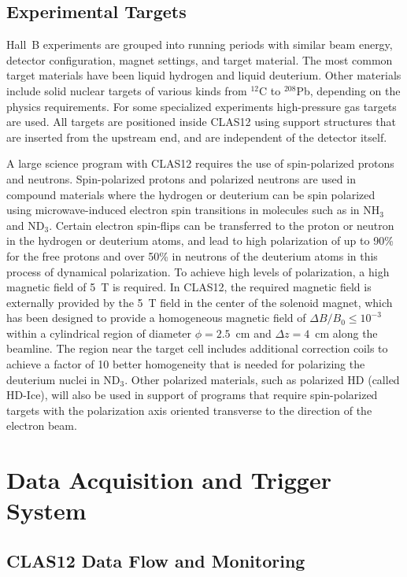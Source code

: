\documentclass[final,3p]{elsarticle}
\begin{document}
\begin{twocolumn}
\subsection{Experimental Targets}

Hall~B experiments are grouped into running periods with similar beam energy, detector configuration, magnet
settings, and target material. The most common target materials have been liquid hydrogen and liquid deuterium.
Other materials include solid nuclear targets of various kinds from $^{12}$C to $^{208}$Pb, depending on the physics
requirements. For some specialized experiments high-pressure gas targets are used. All targets are positioned
inside CLAS12 using support structures that are inserted from the upstream end, and are independent of the
detector itself. 

A large science program with CLAS12 requires the use of spin-polarized protons and neutrons. Spin-polarized
protons and polarized neutrons are used in compound materials where the hydrogen or deuterium can be spin
polarized using microwave-induced electron spin transitions in molecules such as in NH$_3$ and ND$_3$. Certain
electron spin-flips can be transferred to the proton or neutron in the hydrogen or deuterium atoms, and lead to high
polarization of up to 90\% for the free protons and over 50\% in neutrons of the deuterium atoms in this process
of dynamical polarization. To achieve high levels of polarization, a high magnetic field of 5~T is required. In CLAS12,
the required magnetic field is externally provided by the 5~T field in the center of the solenoid magnet, which has
been designed to provide a homogeneous magnetic field of $\Delta B / B_0 \leq 10^{-3}$ within a cylindrical region
of diameter $\phi = 2.5$~cm and $\Delta{z} = 4$~cm along the beamline.  The region near the target cell includes
additional correction coils to achieve a factor of 10 better homogeneity that is needed for polarizing the deuterium
nuclei in ND$_3$. Other polarized materials, such as polarized HD (called HD-Ice), will also be used in support of
programs that require spin-polarized targets with the polarization axis oriented transverse to the direction of the
electron beam.        

\section{Data Acquisition and Trigger System} 

\subsection {CLAS12 Data Flow and Monitoring} 


\end{twocolumn}
\end{document}
